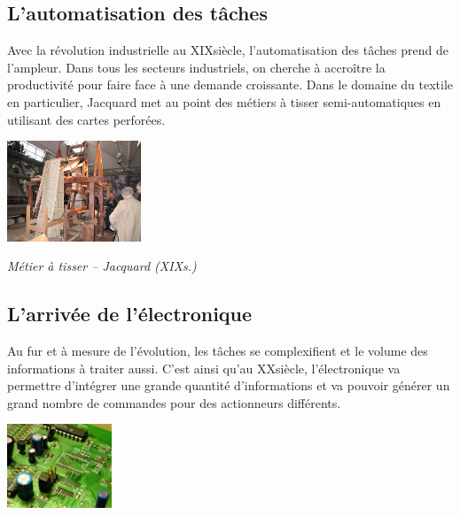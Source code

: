 \documentclass[11pt,oneside]{article}
\begin{document}
\subsection{L'automatisation des tâches}
\begin{minipage}[c]{0.7\textwidth}
Avec la révolution industrielle au XIX\ieme siècle, l'automatisation des tâches prend de l'ampleur. Dans tous les secteurs industriels, on cherche à accroître la productivité pour faire face à une demande croissante. Dans le domaine du textile en particulier, Jacquard met au point des métiers à tisser semi-automatiques en utilisant des cartes perforées.

\end{minipage}\hfill
\begin{minipage}[c]{0.25\textwidth}
 \begin{center}
 \includegraphics[height=3cm]{png/jacquard_p}

\textit{Métier à tisser -- Jacquard (XIX\ieme s.)}
 \end{center}
\end{minipage}

\subsection{L'arrivée de l'électronique}
\begin{minipage}[c]{0.7\textwidth}
Au fur et à mesure de l'évolution, les tâches se complexifient et le volume des informations à traiter aussi. C'est ainsi qu'au XX\ieme siècle, l'électronique va permettre d'intégrer une grande quantité d'informations et va pouvoir générer un grand nombre de commandes pour des actionneurs différents.
\end{minipage}\hfill
\begin{minipage}[c]{0.2\textwidth}
 \begin{center}
 \includegraphics[height=2.5cm]{png/electro_p}
 \end{center}
\end{minipage}
\end{document}
